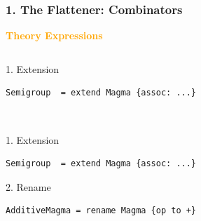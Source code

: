 \documentclass[t,10pt,numbers,fleqn,usenames,xcolor=dvipsnames]{beamer}
\begin{document}
\begin{frame}[fragile] 
\frametitle{1. The Flattener: Combinators} 
\textcolor{Orange}{\textbf{Theory Expressions}} \vspace{0.2cm}

\begin{overprint}
\begin{columns}
\begin{column}{0.45\textwidth}
\scriptsize{1. Extension}
\begin{verbatim}
Semigroup  = extend Magma {assoc: ...}


\end{verbatim}
\end{column}
\begin{column}{0.45\textwidth}


{\scriptsize
}
\end{column}
\end{columns}

\begin{columns}
\begin{column}{0.45\textwidth}
\scriptsize{1. Extension}
\begin{verbatim}
Semigroup  = extend Magma {assoc: ...}
\end{verbatim}
\vspace{0.3cm}
\scriptsize{2. Rename}
\begin{verbatim}
AdditiveMagma = rename Magma {op to +} 
\end{verbatim}
\end{column}
\begin{column}{0.45\textwidth}
{\scriptsize
}
\end{column}
\end{columns}


\end{overprint}
\end{frame}
\end{document}
